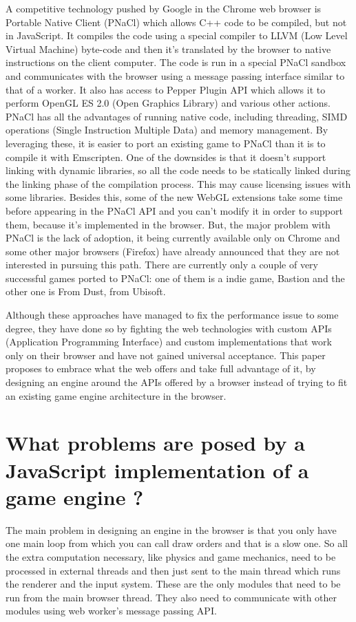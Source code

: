 A competitive technology pushed by Google in the Chrome web browser is Portable Native Client (PNaCl) which allows C++ code to be compiled, but not in JavaScript. It compiles the code using a special compiler to LLVM (Low Level Virtual Machine) byte-code and then it's translated by the browser to native instructions on the client computer. The code is run in a special PNaCl sandbox and communicates with the browser using a message passing interface similar to that of a worker. It also has access to Pepper Plugin API which allows it to perform OpenGL ES 2.0 (Open Graphics Library) and various other actions. PNaCl has all the advantages of running native code, including threading, SIMD operations (Single Instruction Multiple Data) and memory management. By leveraging these, it is easier to port an existing game to PNaCl than it is to compile it with Emscripten. One of the downsides is that it doesn't support linking with dynamic libraries, so all the code needs to be statically linked during the linking phase of the compilation process. This may cause licensing issues with some libraries. Besides this, some of the new WebGL extensions take some time before appearing in the PNaCl API and you can't modify it in order to support them, because it's implemented in the browser. But, the major problem with PNaCl is the lack of adoption, it being currently available only on Chrome and some other major browsers (Firefox) have already announced that they are not interested in pursuing this path. There are currently only a couple of very successful games ported to PNaCl: one of them is a indie game, Bastion and the other one is From Dust, from Ubisoft.


Although these approaches have managed to fix the performance issue to some degree, they have done so by fighting the web technologies with custom APIs (Application Programming Interface) and custom implementations that work only on their browser and have not gained universal acceptance. This paper proposes to embrace what the web offers and take full advantage of it, by designing an engine around the APIs offered by a browser instead of trying to fit an existing game engine architecture in the browser.


\section{What problems are posed by a JavaScript implementation of a game engine ?}
\label{sec:game engine}

The main problem in designing an engine in the browser is that you only have one main loop from which you can call draw orders and that is a slow one. So all the extra computation necessary, like physics and game mechanics, need to be processed in external threads and then just sent to the main thread which runs the renderer and the input system. These are the only modules that need to be run from the main browser thread. They also need to communicate with other modules using web worker's message passing API.

